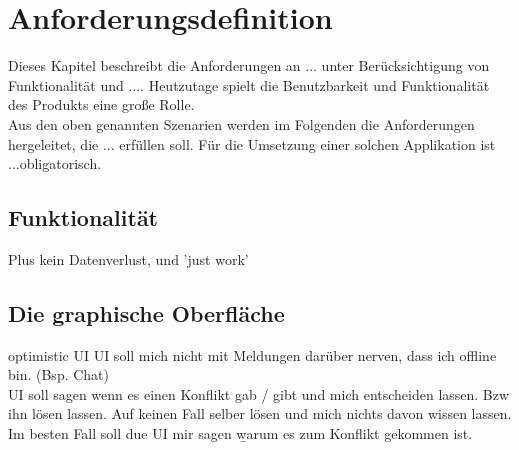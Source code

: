 \chapter{\label{chap:anforderungen}Anforderungsdefinition}
Dieses Kapitel beschreibt die Anforderungen an ... unter Berücksichtigung von Funktionalität und ....
Heutzutage spielt die Benutzbarkeit und Funktionalität des Produkts eine große Rolle.\\
Aus den oben genannten Szenarien werden im Folgenden die Anforderungen hergeleitet, die ... erfüllen soll.
Für die Umsetzung einer solchen Applikation ist ...obligatorisch.
%
%

%
%
\section{Funktionalität}
 Plus kein Datenverlust, und 'just work'
%
%
\section{Die graphische Oberfläche}
\Gls{optimistic UI}
\gls{UI} soll mich nicht mit Meldungen darüber nerven, dass ich offline bin. (Bsp. Chat)\\
\gls{UI} soll sagen wenn es einen Konflikt gab / gibt und mich entscheiden lassen. Bzw ihn lösen lassen.
Auf keinen Fall selber lösen und mich nichts davon wissen lassen.\\
Im besten Fall soll due UI mir sagen \b{warum} es zum Konflikt gekommen ist.
